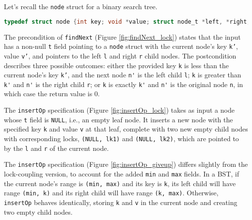 \documentclass[a4paper,UKenglish,cleveref, autoref, thm-restate]{lipics-v2021}
\newcommand{\wm}[1]{\textbf{\textcolor{violet}{[William: #1]}}}
\begin{document}
Let's recall the \texttt{node} struct for a binary search tree. 
\begin{lstlisting}[language = C, backgroundcolor=\color{white}, basicstyle=\ttfamily\footnotesize]
	typedef struct node {int key; void *value; struct node_t *left, *right;} node;
\end{lstlisting}
The precondition of \texttt{findNext} (Figure \ref*{fig:findNext_lock}) states that the input has a non-null \texttt{t} field pointing to a \texttt{node} struct with the current node's key \texttt{k'}, value \texttt{v'}, and pointers to the left \texttt{l} and right \texttt{r} child nodes. The postcondition describes three possible outcomes: either the provided key \texttt{k} is less than the current node's key \texttt{k'}, and the next node \lstinline{n'} is the left child \lstinline{l}; \lstinline{k} is greater than \lstinline{k'} and \lstinline{n'} is the right child \lstinline{r}; or \lstinline{k} is exactly \lstinline{k'} and \lstinline{n'} is the original node \lstinline{n}, in which case the return value is 0.

The \texttt{insertOp} specification (Figure \ref{fig:insertOp_lock}) takes as input a node whose \lstinline{t} field is \lstinline{NULL}, i.e., an empty leaf node. It inserts a new node with the specified key \texttt{k} and value \texttt{v} at that leaf, complete with two new empty child nodes with corresponding locks, \texttt{(NULL, lk1)} and \texttt{(NULL, lk2)}, which are pointed to by the \texttt{l} and \texttt{r} of the current node.  

The \texttt{insertOp} specification (Figure \ref{fig:insertOp_giveup}) differs slightly from the lock-coupling version, to account for the added \lstinline{min} and \lstinline{max} fields. In a BST, if the current node's range is \lstinline{(min, max)} and its key is \lstinline{k}, its left child will have range \texttt{(min, k)} and its right child will have range \texttt{(k, max)}. Otherwise, \lstinline{insertOp} behaves identically, storing \lstinline{k} and \lstinline{v} in the current node and creating two empty child nodes.
\end{document}
